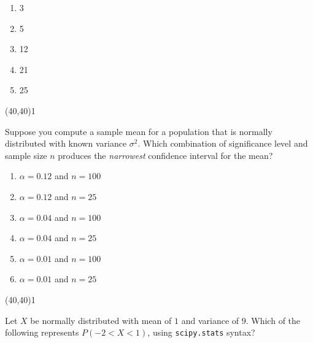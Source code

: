 \documentclass[addpoints]{exam}
\def\solutions{0}
\begin{document}
{\begin{questions}
\begin{minipage}[b]{.85\textwidth}
	\begin{enumerate}[label=\Alph*.]
		\item 3
		\item 5
		\item 12
		\item 21
		\item 25

	\end{enumerate}
\end{minipage}
\begin{minipage}[b]{.1\textwidth}
	\vspace{\fill}\framebox(40,40){\if\solutions1 \fi}
\end{minipage}
%

\question[3]  Suppose you compute a sample mean for a population that is normally distributed with known variance $\sigma^2$. Which combination of significance level and sample size $n$ produces the \textit{narrowest} confidence interval for the mean?
\vspace{2mm}

\begin{minipage}[b]{.85\textwidth}
	\begin{enumerate}[label=\Alph*.]
		\item $\alpha=0.12$ and $n=100$
		\item $\alpha=0.12$ and $n=25$
		\item $\alpha=0.04$ and $n=100$
		\item $\alpha=0.04$ and $n=25$
		\item $\alpha=0.01$ and $n=100$
		\item $\alpha=0.01$ and $n=25$
	\end{enumerate}
\end{minipage}
\begin{minipage}[b]{.1\textwidth}
	\vspace{\fill}\framebox(40,40){\if\solutions1 \fi}
\end{minipage}
%


\question[3] Let $X$ be normally distributed with mean of $1$ and variance of $9$.  Which of the following represents $P(-2<X<1)$, using \texttt{scipy.stats} syntax?

\vspace{2mm}


\end{questions}}
\end{document}
